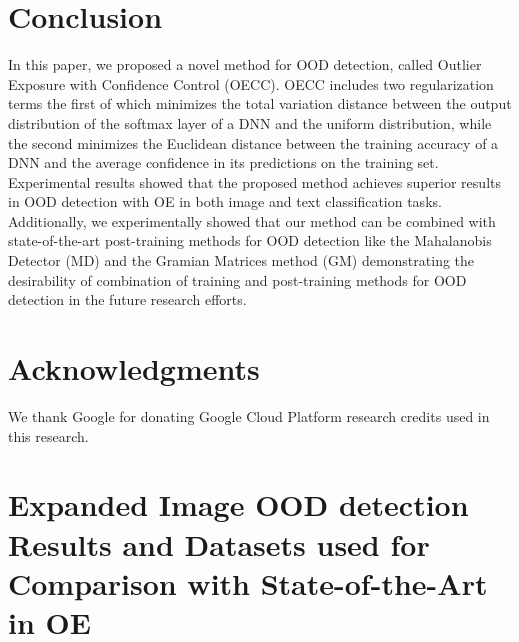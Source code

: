 \documentclass{article} \usepackage{iclr2020_conference,times}
\begin{document}
  

\section{Conclusion}
In this paper, we proposed a novel method for OOD detection, called Outlier Exposure with Confidence Control (OECC). OECC includes two regularization terms the first of which minimizes the total variation distance between the output distribution of the softmax layer of a DNN and the uniform distribution, while the second minimizes the Euclidean distance between the training accuracy of a DNN and the average confidence in its predictions on the training set. Experimental results showed that the proposed method achieves superior results in OOD detection with OE \citep{hendrycks2019oe} in both image and text classification tasks. Additionally, we experimentally showed that our method can be combined with state-of-the-art post-training methods for OOD detection like the Mahalanobis Detector (MD) \citep{Lee:2018:SUF:3327757.3327819} and the Gramian Matrices method (GM) \citep{ch2019detecting} demonstrating the desirability of combination of training and post-training methods for OOD detection in the future research efforts.  

\clearpage

\section*{Acknowledgments}
We thank Google for donating Google Cloud Platform research credits used in this research. 







\clearpage

\appendix
\section{Expanded Image OOD detection Results and Datasets used for Comparison with State-of-the-Art in OE}
\end{document}
